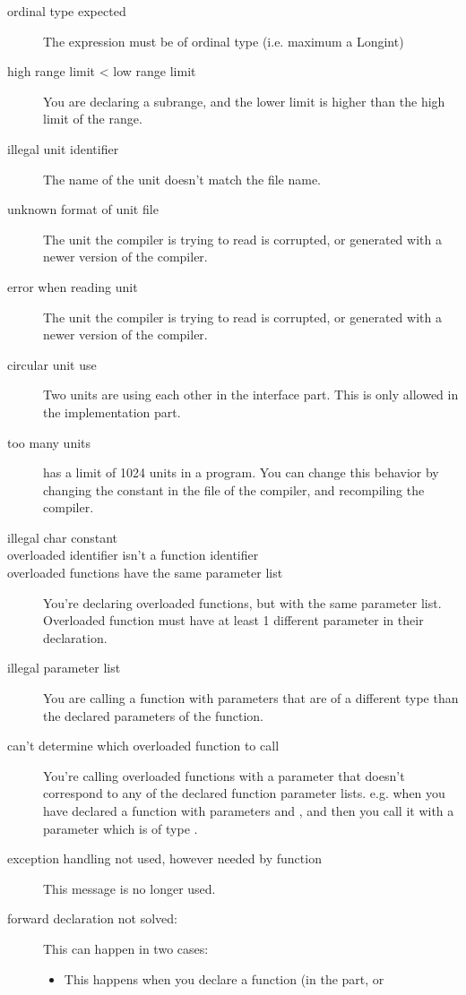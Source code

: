 \documentclass{report}
\begin{document}
\begin{description}
\item [ordinal type expected]
The expression must be of ordinal type (i.e. maximum a Longint)
\item [high range limit < low range limit]
You are declaring a subrange, and the lower limit is higher than the high
limit of the range.
\item [illegal unit identifier]
The name of the unit doesn't match the file name.
\item [unknown format of unit file]
The unit the compiler is trying to read is corrupted, or generated with a
newer version of the compiler.
\item [error when reading unit]
The unit the compiler is trying to read is corrupted, or generated with a
newer version of the compiler.
\item [circular unit use]
Two units are using each other in the interface part. This is only allowed
in the implementation part.
\item [too many units]
\fpk has a limit of 1024 units in a program. You can change this behavior
by changing the  constant in the  file of the
compiler, and recompiling the compiler. 
\item [illegal char constant]
\item [overloaded identifier isn't a function identifier]
\item [overloaded functions have the same parameter list]
You're declaring overloaded functions, but with the same parameter list.
Overloaded function must have at least 1 different parameter in their
declaration.
\item [illegal parameter list]
You are calling a function with parameters that are of a different type than
the declared parameters of the function.
\item [can't determine which overloaded function to call]
You're calling overloaded functions with a parameter that doesn't correspond
to any of the declared function parameter lists. e.g. when you have declared
a function with parameters  and , and then you call
it with a parameter which is of type .
\item [exception handling not used, however needed by function]
This message is no longer used.
\item [forward declaration not solved:]
This can happen in two cases:
\begin{itemize}
\item This happens when you declare a function (in the  part, or

\end{itemize}
\end{description}
\end{document}
